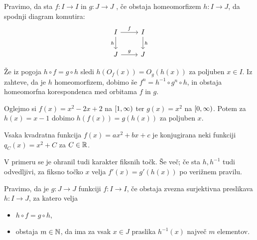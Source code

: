 
\begin{definicija}
  Pravimo, da sta $f: I \to I$ in $g: J \to J$ , če obstaja
  homeomorfizem $h: I \to J$, da spodnji diagram komutira:
  \[
	\begin{tikzcd}
	  I & I \\
	  J & J
	  \arrow["f", from=1-1, to=1-2]
	  \arrow["h"', from=1-1, to=2-1]
	  \arrow["h", from=1-2, to=2-2]
	  \arrow["g", from=2-1, to=2-2]
	\end{tikzcd}
  \]
\end{definicija}

\begin{opomba}
  Že iz pogoja $h \circ f = g \circ h$ sledi $h(O_f(x)) = O_g(h(x))$ za poljuben
  $x \in I$.
  Iz zahteve, da je $h$ homeomorfizem, dobimo še $f^n = h^{-1} \circ g^n \circ
  h$, in obstaja homeomorfna korespondenca med orbitama $f$ in $g$.
\end{opomba}

\begin{primer}
  Oglejmo si $f(x) = x^2 - 2x + 2$ na $\left[1, \infty\right)$ ter $g(x) = x^2$ na
  $\left[0, \infty\right)$.
  Potem za $h(x) = x-1$ dobimo $h(f(x)) = g(h(x))$ za poljuben $x$.
\end{primer}

\begin{opomba}
  Vsaka kvadratna funkcija $f(x) = ax^2 + bx+c$ je konjugirana neki funkciji
  $q_C(x) = x^2 + C$ za $C \in \mathbb{R}$.
\end{opomba}

\begin{opomba}
  V primeru se je ohranil tudi karakter fiksnih točk.
  Še več; če sta $h, h^{-1}$ tudi odvedljivi, za fiksno točko $x$ velja $f'(x) =
  g'(h(x))$ po verižnem pravilu.
\end{opomba}

\begin{definicija}
  Pravimo, da je $g: J \to J$  funkciji $f: I \to I$, če
  obstaja zvezna surjektivna preslikava $h: I \to J$, za katero velja
  \begin{itemize}
  \item $h \circ f = g \circ h$,
  \item obstaja $m \in \mathbb{N}$, da ima za vsak $x \in J$ praslika $h^{-1}(x)$ največ
	$m$ elementov.
  \end{itemize}
\end{definicija}

